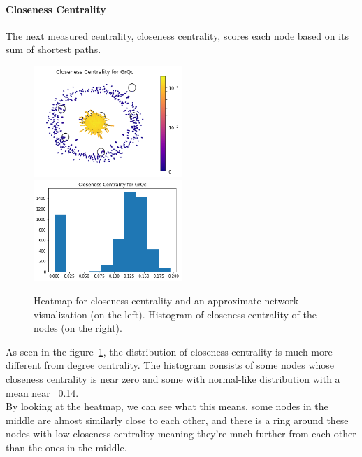 \documentclass[letterpaper, 11pt]{article}
\newcommand{\1}{\mathds{1}}	%
\theoremstyle{definition}
\begin{document}
\paragraph{Closeness Centrality}The next measured centrality, closeness centrality, scores each node based on its sum of shortest paths. 
\begin{figure}[h]
\includegraphics[width=0.5\textwidth]{GrQc_c_cent.png}
\includegraphics[width=0.5\textwidth]{GrQc_c_cent_hist.png}
\captionsetup{justification=centering,margin=0.5cm}
\caption{Heatmap for closeness centrality and an approximate network visualization (on the left). Histogram of closeness centrality of the nodes (on the right).}
\label{fig:c_cent}
\end{figure}
As seen in the figure~\ref{fig:c_cent}, the distribution of closeness centrality is much more different from degree centrality. The histogram consists of some nodes whose closeness centrality is near zero and some with normal-like distribution with a mean near ~0.14. \\
By looking at the heatmap, we can see what this means, some nodes in the middle are almost similarly close to each other, and there is a ring around these nodes with low closeness centrality meaning they're much further from each other than the ones in the middle.
\end{document}
